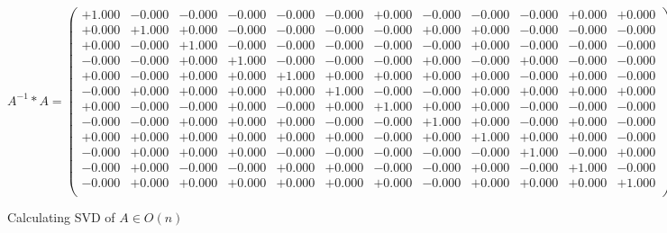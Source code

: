 \documentclass[9pt]{article}
\theoremstyle{plain}
\theoremstyle{definition}
\theoremstyle{remark}
\numberwithin{equation}{section}
\begin{document}
$A^{-1} *A = \left(
\begin{array}{
cccccccccccc}
+1.000 & -0.000 & -0.000 & -0.000 & -0.000 & -0.000 & +0.000 & -0.000 & -0.000 & -0.000 & +0.000 & +0.000 \\
+0.000 & +1.000 & +0.000 & -0.000 & -0.000 & -0.000 & -0.000 & +0.000 & +0.000 & -0.000 & -0.000 & -0.000 \\
+0.000 & -0.000 & +1.000 & -0.000 & -0.000 & -0.000 & -0.000 & -0.000 & +0.000 & -0.000 & -0.000 & -0.000 \\
-0.000 & -0.000 & +0.000 & +1.000 & -0.000 & -0.000 & -0.000 & +0.000 & -0.000 & +0.000 & -0.000 & -0.000 \\
+0.000 & -0.000 & +0.000 & +0.000 & +1.000 & +0.000 & +0.000 & +0.000 & +0.000 & -0.000 & +0.000 & -0.000 \\
-0.000 & +0.000 & +0.000 & +0.000 & +0.000 & +1.000 & -0.000 & -0.000 & +0.000 & +0.000 & +0.000 & +0.000 \\
+0.000 & -0.000 & -0.000 & +0.000 & -0.000 & +0.000 & +1.000 & +0.000 & +0.000 & -0.000 & -0.000 & -0.000 \\
-0.000 & -0.000 & +0.000 & +0.000 & +0.000 & -0.000 & -0.000 & +1.000 & +0.000 & -0.000 & +0.000 & -0.000 \\
+0.000 & +0.000 & +0.000 & +0.000 & +0.000 & +0.000 & -0.000 & +0.000 & +1.000 & +0.000 & +0.000 & -0.000 \\
-0.000 & +0.000 & +0.000 & +0.000 & -0.000 & -0.000 & -0.000 & -0.000 & -0.000 & +1.000 & -0.000 & +0.000 \\
-0.000 & +0.000 & -0.000 & -0.000 & +0.000 & +0.000 & -0.000 & -0.000 & +0.000 & -0.000 & +1.000 & -0.000 \\
-0.000 & +0.000 & +0.000 & +0.000 & +0.000 & +0.000 & +0.000 & -0.000 & +0.000 & +0.000 & +0.000 & +1.000 \\
\end{array}
\right)$ \newline 

Calculating SVD of  $A \in O(n)$
\end{document}
